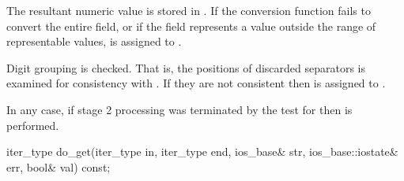 \begin{itemdescr}
\begin{description}
The resultant numeric value is stored in .
If the conversion function fails to convert the entire field, or
if the field represents a value outside the range of representable values,
 is assigned to .

\end{description}

\pnum
Digit grouping is checked.
That is, the positions of discarded
separators is examined for consistency with
.
If they are not consistent then
is assigned to .

\pnum
In any case, if stage 2 processing was terminated by the test for
then
is performed.
\end{itemdescr}

%
%
\begin{itemdecl}
iter_type do_get(iter_type in, iter_type end, ios_base& str,
                 ios_base::iostate& err, bool& val) const;
\end{itemdecl}

